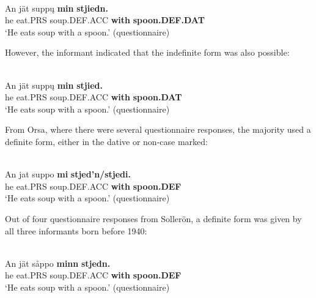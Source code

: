 
\ea \label{} 
\\
\gll An  jät  supp\k{u}  \textbf{min} \textbf{  stjiedn.}\\
he  eat.PRS  soup.DEF.ACC  \textbf{with} \textbf{spoon.DEF.DAT}\\
\glt ‘He eats soup with a spoon.’ (questionnaire)

\z

However, the informant indicated that the indefinite form was also possible:


\ea \label{} 
\\
\gll An  jät  supp\k{u}  \textbf{min} \textbf{  stjied.}\\
he  eat.PRS  soup.DEF.ACC  \textbf{with} \textbf{spoon.DAT}\\
\glt ‘He eats soup with a spoon.’ (questionnaire)

\z

From Orsa, where there were several questionnaire responses, the majority used a definite form, either in the dative or non-case marked:


\ea \label{} 
\\
\gll An  jat  suppo  \textbf{mi} \textbf{  stjed’n/stjedi.}\\
he  eat.PRS  soup.DEF.ACC  \textbf{with} \textbf{spoon.DEF}\\
\glt ‘He eats soup with a spoon.’ (questionnaire)

\z

Out of four questionnaire responses from Sollerön, a definite form was given by all three informants born before 1940:


\ea \label{} 
\\
\gll An  jät  såppo  \textbf{minn} \textbf{  stjedn.} \\
he  eat.PRS  soup.DEF.ACC  \textbf{with} \textbf{spoon.DEF} \\
\glt ‘He eats soup with a spoon.’ (questionnaire)

